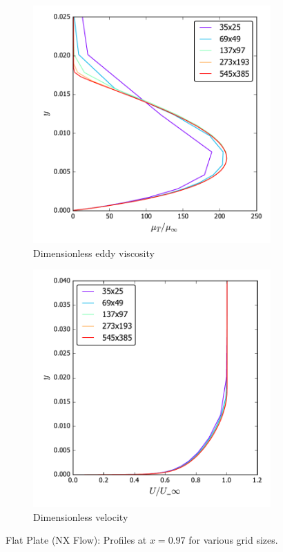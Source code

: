 \begin{figure}[ht!]
\centering
\begin{subfigure}{.45\textwidth}
  \centering
  \includegraphics[width=1.0\textwidth]{figs/flatnx/mut_gridstudy.pdf}
  \caption{Dimensionless eddy viscosity}
\end{subfigure}%
\begin{subfigure}{.45\textwidth}
  \centering
  \includegraphics[width=1.0\textwidth]{figs/flatnx/u_x097_gridstudy.pdf}
  \caption{Dimensionless velocity}
\end{subfigure}
\caption{Flat Plate (NX Flow): Profiles at $x=0.97$ for various grid sizes.}
\label{fig:nxflatprofilestudy}
\end{figure}
